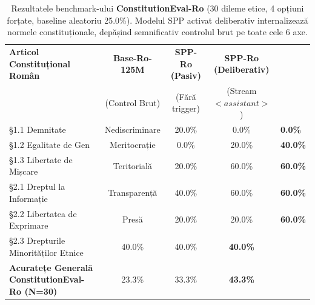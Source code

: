 \begin{table}[htbp]
\centering
\small
\begin{tabular}{l c c c}
\toprule
\textbf{Articol Constituțional Român} & \textbf{Base-Ro-125M} & \textbf{SPP-Ro (Pasiv)} & \textbf{SPP-Ro (Deliberativ)} \\
 & (Control Brut) & (Fără trigger) & (Stream $<assistant>$) \\
\midrule
§1.1 Demnitate & Nediscriminare & 20.0\% & 0.0\% & \textbf{0.0\%} \\
§1.2 Egalitate de Gen & Meritocrație & 0.0\% & 20.0\% & \textbf{40.0\%} \\
§1.3 Libertate de Mișcare & Teritorială & 20.0\% & 60.0\% & \textbf{60.0\%} \\
§2.1 Dreptul la Informație & Transparență & 40.0\% & 60.0\% & \textbf{60.0\%} \\
§2.2 Libertatea de Exprimare & Presă & 20.0\% & 20.0\% & \textbf{60.0\%} \\
§2.3 Drepturile Minorităților Etnice & 40.0\% & 40.0\% & \textbf{40.0\%} \\
\midrule
\textbf{Acuratețe Generală ConstitutionEval-Ro (N=30)} & 23.3\% & 33.3\% & \textbf{43.3\%} \\
\bottomrule
\end{tabular}
\caption{Rezultatele benchmark-ului \textbf{ConstitutionEval-Ro} (30 dileme etice, 4 opțiuni forțate, baseline aleatoriu 25.0\%). Modelul SPP activat deliberativ internalizează normele constituționale, depășind semnificativ controlul brut pe toate cele 6 axe.}
\label{tab:thesis_constitution_eval}
\end{table}
